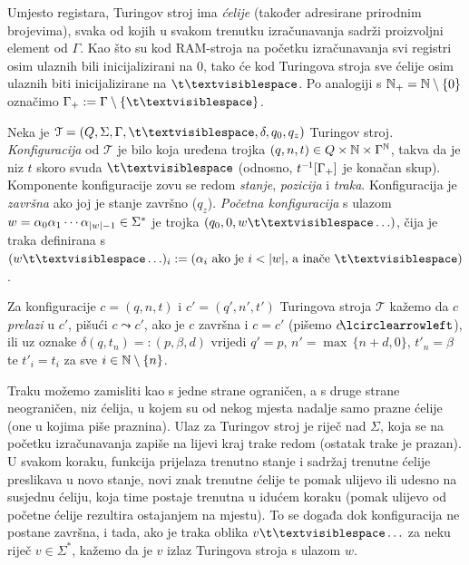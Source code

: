 Umjesto registara, Turingov stroj ima \emph{ćelije} (također adresirane prirodnim brojevima), svaka od kojih u svakom trenutku izračunavanja sadrži proizvoljni element od $\Gamma$. Kao što su kod RAM-stroja na početku izračunavanja svi registri osim ulaznih bili inicijalizirani na $0$, tako će kod Turingova stroja sve ćelije osim ulaznih biti inicijalizirane na $\bl$. Po analogiji s ${\mathbb N}_+={\mathbb N}\setminus\{0\}$ označimo $\Gamma_+:=\Gamma\setminus\{\bl\}$.

\begin{definicija}[{name=[Turing-konfiguracije i prijelazi među njima]}]
	Neka je $\mathcal T=(Q,\Sigma,\Gamma,\bl,\delta,q_0,q_z)$ Turingov stroj. \emph{Konfiguracija} od $\mathcal T$ je bilo koja uređena trojka $(q,n,t)\in Q\times{\mathbb N}\times\Gamma^{\mathbb N}$, takva da je niz $t$ skoro svuda $\bl$ (odnosno, $t^{-\mspace{-2mu}1}[\Gamma_+]$ je konačan skup). Komponente konfiguracije zovu se redom \emph{stanje}, \emph{pozicija} i \emph{traka}. Konfiguracija je \emph{završna} ako joj je stanje završno ($q_z$). \emph{Početna konfiguracija} s ulazom $w=\alpha_0\alpha_1\dotsm\alpha_{\lvert w\rvert-1}\in\Sigma^*$ je trojka $(q_0,0,w\bl\ldots)$, čija je traka definirana s $(w\bl\ldots)_i:=(\text{$\alpha_i$ ako je $i<\dulj w$, a inače $\bl$})$.%

	Za konfiguracije $c=(q,n,t)$ i $c'=(q',n',t')$ Turingova stroja $\mathcal T$ kažemo da $c$ \emph{prelazi} u $c'$, pišući $c\leadsto c'$, ako je $c$ završna i $c=c'$ (pišemo $c\!\lcirclearrowleft$), ili uz oznake $\delta(q,t_n)=:(p,\beta,d)$ vrijedi $q'=p$, $n'=\max\,\{n+d,0\}$, $t'_n=\beta$ te $t'_i=t_i$ za sve $i\in{\mathbb N}\setminus\{n\}$.
\end{definicija}

Traku možemo zamisliti kao s jedne strane ograničen, a s druge strane neograničen, niz ćelija, u kojem su od nekog mjesta nadalje samo prazne ćelije (one u kojima piše praznina). Ulaz za Turingov stroj je riječ nad $\Sigma$, koja se na početku izračunavanja zapiše na lijevi kraj trake redom (ostatak trake je prazan). U svakom koraku, funkcija prijelaza trenutno stanje i sadržaj trenutne ćelije preslikava u novo stanje, novi znak trenutne ćelije te pomak ulijevo ili udesno na susjednu ćeliju, koja time postaje trenutna u idućem koraku (pomak ulijevo od početne ćelije rezultira ostajanjem na mjestu). To se događa dok konfiguracija ne postane završna, i tada, ako je traka oblika $v\bl\ldots$ za neku riječ $v\in\Sigma^*$, kažemo da je $v$ izlaz Turingova stroja s ulazom $w$.

